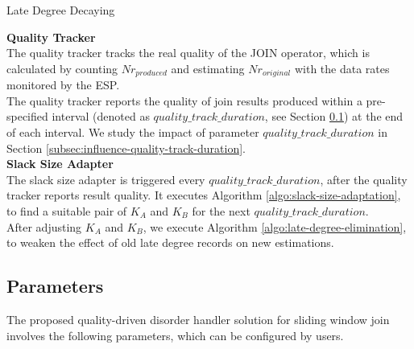 \documentclass[a4paper, 11pt, twoside]{report}
\begin{document}
\begin{algorithm}[H]
\caption{Late Degree Decaying\label{algo:late-degree-elimination}}
\end{algorithm}

\hspace{20pt}

\noindent\textbf{Quality Tracker}\\

The quality tracker tracks the real quality of the JOIN operator, which is calculated by counting $Nr_{produced}$ and estimating $Nr_{original}$ with the data rates monitored by the ESP.\\

The quality tracker reports the quality of join results produced within a pre-specified interval (denoted as $quality\_track\_duration$, see Section \ref{subsec:parameters}) at the end of each interval. We study the impact of parameter $quality\_track\_duration$ in Section \ref{subsec:influence-quality-track-duration}.\\

\noindent\textbf{Slack Size Adapter}\\

The slack size adapter is triggered every $quality\_track\_duration$, after the quality tracker reports result quality. It executes Algorithm \ref{algo:slack-size-adaptation}, to find a suitable pair of $K_A$ and $K_B$ for the next $quality\_track\_duration$.\\

After adjusting $K_A$ and $K_B$, we execute Algorithm \ref{algo:late-degree-elimination}, to weaken the effect of old late degree records on new estimations.

\subsection{Parameters}
\label{subsec:parameters}

The proposed quality-driven disorder handler solution for sliding window join involves the following parameters, which can be configured by users.\\
\end{document}
